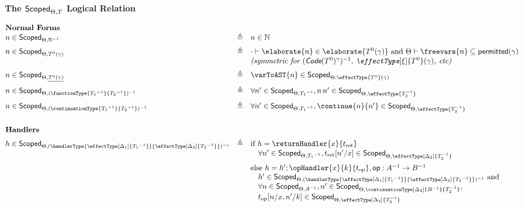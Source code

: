 \begin{figure}
\begin{source-desc}
  {\large\textbf{The $\textsf{Scoped}_{{\Theta}, {T}}$ Logical Relation}}
  \vspace{5mm}

  $
  \begin{array}{@{}lllr}
    \textbf{Normal Forms} \\\vspace{2mm}
    n \in \scoped{\mathbb{N}^{-1}} & \triangleq & n \in \mathbb{N} \\ 
    n \in \scoped{{T}^{0}(\gamma)} & \triangleq & \cdot \vdash \elaborate{n} \in \elaborate{T^{0} (\gamma)} \text{ and } \Theta \vdash \freevars{n} \subseteq \textsf{permitted}(\gamma) \\\vspace{2mm}
    && \textit{(symmetric for $(\textsf{Code}(T^0)^{\gamma})^{-1}$, $\effectType[\xi]{T^{0}} (\gamma)$, etc) }\\\vspace{2mm}
    n \in \scoped{\underline{{T}^{0}(\gamma)}} & \triangleq & \varToAST{n} \in \scoped{\effectType{T^{0}} (\gamma)} \\ \vspace{2mm}
    n \in \scoped{(\functionType{{T_1}^{-1}}{{T_2}^{-1}})^{-1}} & \triangleq & \forall n' \in \scoped{{T_1}^{-1}}, n \, n' \in \scoped{\effectType{T_2^{-1}}} \\ \vspace{2mm}
    n \in \scoped{(\continuationType{{T_1}^{-1}}{{T_2}^{-1}})^{-1}} & \triangleq & \forall n' \in \scoped{{T_1}^{-1}}, \continue{n}{n'} \in \scoped{\effectType{T_2^{-1}}} \\\\ \vspace{2mm}
    \textbf{Handlers} \\
    h \in \scoped{(\handlerType{\effectType[\Delta_1]{{T_1}^{-1}}}{\effectType[\Delta_2]{{T_2}^{-1}}})^{-1}} & \triangleq & \text{if } h = \returnHandler{x}{t_{\text{ret}}}\\ \vspace{2mm}
    && \quad \forall n' \in \scoped{{T_1}^{-1}}, t_{\text{ret}}[n'/x] \in \scoped{\effectType[\Delta_2]{T_2^{-1}}} \\
    && \text{else } h = h'; \opHandler{x}{k}{t_{\text{op}}}, \textsf{op}: A^{-1} \to B^{-1} \\
    && \quad h' \in \scoped{(\handlerType{\effectType[\Delta_1]{{T_1}^{-1}}}{\effectType[\Delta_2]{{T_2}^{-1}}})^{-1}} \text{ and}\\ 
    && \quad \forall n \in \scoped{{A}^{-1}}, n' \in \scoped{\continuationType[\Delta_2]{{B}^{-1}}{T_2^{-1}}}, \\ && \quad t_{\text{op}}[n/x, n'/k] \in \scoped{\effectType[\Delta_2]{T_2^{-1}}}\\\\
  \end{array}
$


\end{source-desc}
\end{figure}
